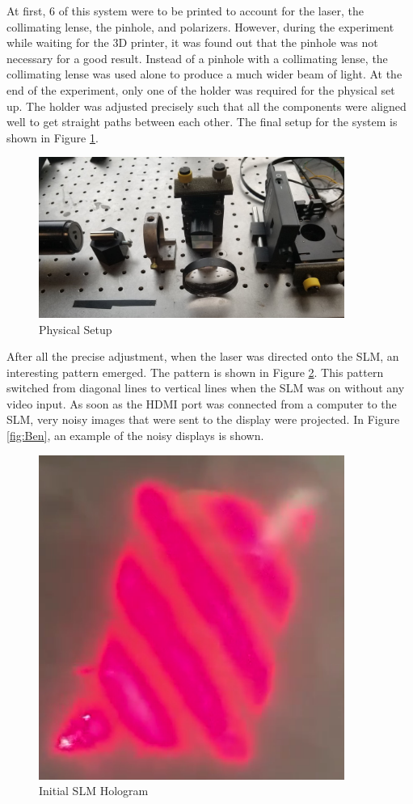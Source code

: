 \documentclass[12pt]{article}
\begin{document}
At first, 6 of this system were to be printed to account for the laser, the collimating lense, the pinhole, and polarizers. However, during the experiment while waiting for the 3D printer, it was found out that the pinhole was not necessary for a good result. Instead of a pinhole with a collimating lense, the collimating lense was used alone to produce a much wider beam of light. At the end of the experiment, only one of the holder was required for the physical set up. The holder was adjusted precisely such that all the components were aligned well to get straight paths between each other. The final setup for the system is shown in Figure \ref{fig:setup_picture}.

\begin{figure}
    \centering
    \includegraphics[width=100mm]{setup_picture.jpg}
    \caption{Physical Setup}
    \label{fig:setup_picture}
\end{figure}

After all the precise adjustment, when the laser was directed onto the SLM, an interesting pattern emerged. The pattern is shown in Figure \ref{fig:simple_pattern}. This pattern switched from diagonal lines to vertical lines when the SLM was on without any video input. As soon as the HDMI port was connected from a computer to the SLM, very noisy images that were sent to the display were projected. In Figure \ref{fig:Ben}, an example of the noisy displays is shown.

\begin{figure}
    \centering
    \includegraphics[width=100mm]{initHologram.png}
    \caption{Initial SLM Hologram}
    \label{fig:simple_pattern}
\end{figure}
\end{document}
